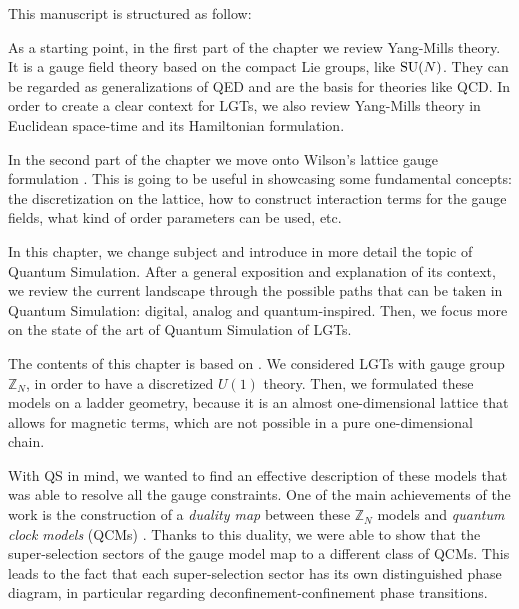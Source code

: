\noindent This manuscript is structured as follow:
\begin{description}[labelsep=1.1em]
    \item[Chap.~\ref{chap:introduction_to_lattice_gauge_theories}]
        As a starting point, in the first part of the chapter we review Yang-Mills theory.
        It is a gauge field theory based on the compact Lie groups, like $\text{SU}(N)$.
        They can be regarded as generalizations of QED and are the basis for theories like QCD.
        In order to create a clear context for LGTs, we also review Yang-Mills theory in Euclidean space-time and its Hamiltonian formulation.

        In the second part of the chapter we move onto Wilson's lattice gauge formulation \cite{wilson1974confinement}.
        This is going to be useful in showcasing some fundamental concepts: the discretization on the lattice, how to construct interaction terms for the gauge fields, what kind of order parameters can be used, etc.


    \item[Chap.~\ref{chap:quantum_simulation_of_lattice_gauge_theories}]
        In this chapter, we change subject and introduce in more detail the topic of Quantum Simulation.
        After a general exposition and explanation of its context, we review the current landscape through the possible paths that can be taken in Quantum Simulation: digital, analog and quantum-inspired.
        Then, we focus more on the state of the art of Quantum Simulation of LGTs.


    \item[Chap.~\ref{chap:dualities_in_abelian_models}]
        The contents of this chapter is based on \cite{pradhan2022ladder}.
        We considered LGTs with gauge group $\mathbb{Z}_N$, in order to have a discretized $U(1)$ theory.
        Then, we formulated these models on a ladder geometry, because it is an almost one-dimensional lattice that allows for magnetic terms, which are not possible in a pure one-dimensional chain.

        With QS in mind, we wanted to find an effective description of these models that was able to resolve all the gauge constraints.
        One of the main achievements of the work is the construction of a \emph{duality map} between these $\mathbb{Z}_N$ models and \emph{quantum clock models} (QCMs) \cite{ortiz2012dualities}.
        Thanks to this duality, we were able to show that the super-selection sectors of the gauge model map to a different class of QCMs.
        This leads to the fact that each super-selection sector has its own distinguished phase diagram, in particular regarding deconfinement-confinement phase transitions.



\end{description}
